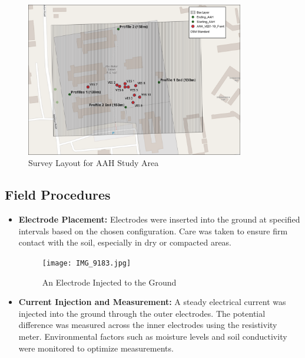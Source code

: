 \documentclass[12pt,a4paper]{report}
\begin{document}
\begin{itemize}
    \begin{figure}[H]
        \centering
        \includegraphics[width=0.85\textwidth]{AAH_Survery-Layout.png}
        \caption{Survey Layout for AAH Study Area}
        \label{fig:AAH Survey Layout}
    \end{figure}

\end{itemize}

\subsection{Field Procedures}
\begin{itemize}
    \item \textbf{Electrode Placement:} Electrodes were inserted into the ground at specified intervals based on the chosen configuration. Care was taken to ensure firm contact with the soil, especially in dry or compacted areas.
    \begin{figure}[H]
        \centering
        \texttt{[image: IMG\_9183.jpg]}
        \caption{An Electrode Injected to the Ground }
    \end{figure}
    \item \textbf{Current Injection and Measurement:} A steady electrical current was injected into the ground through the outer electrodes. The potential difference was measured across the inner electrodes using the resistivity meter. Environmental factors such as moisture levels and soil conductivity were monitored to optimize measurements.
\end{itemize}
\end{document}
